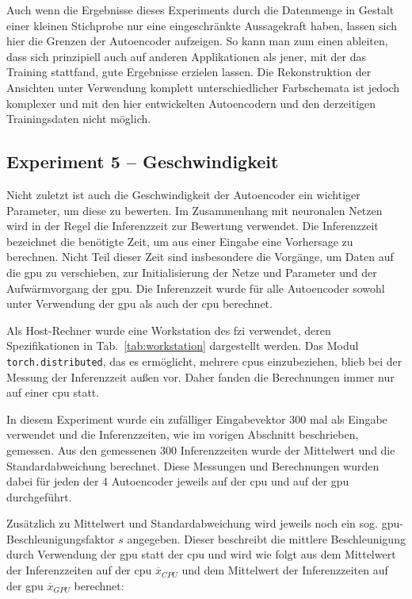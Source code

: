 Auch wenn die Ergebnisse dieses Experiments durch die Datenmenge in Gestalt einer kleinen Stichprobe nur eine eingeschränkte Aussagekraft haben, lassen sich hier die Grenzen der Autoencoder aufzeigen. So kann man zum einen ableiten, dass sich prinzipiell auch auf anderen Applikationen als jener, mit der das Training stattfand, gute Ergebnisse erzielen lassen. Die Rekonstruktion der Ansichten unter Verwendung komplett unterschiedlicher Farbschemata ist jedoch komplexer und mit den hier entwickelten Autoencodern und den derzeitigen Trainingsdaten nicht möglich.

\subsection{Experiment 5 -- Geschwindigkeit}
\label{subsec:exp5}
Nicht zuletzt ist auch die Geschwindigkeit der Autoencoder ein wichtiger Parameter, um diese zu bewerten. Im Zusammenhang mit neuronalen Netzen wird in der Regel die Inferenzzeit zur Bewertung verwendet. Die Inferenzzeit bezeichnet die benötigte Zeit, um aus einer Eingabe eine Vorhersage zu berechnen. Nicht Teil dieser Zeit sind insbesondere die Vorgänge, um Daten auf die \gls{gpu} zu verschieben, zur Initialisierung der Netze und Parameter und der Aufwärmvorgang der \gls{gpu}. Die Inferenzzeit wurde für alle Autoencoder sowohl unter Verwendung der \gls{gpu} als auch der \gls{cpu} berechnet.

Als Host-Rechner wurde eine Workstation des \gls{fzi} verwendet, deren Spezifikationen in Tab.~\ref{tab:workstation} dargestellt werden. Das Modul \texttt{torch.distributed}, das es ermöglicht, mehrere \glspl{cpu} einzubeziehen, blieb bei der Messung der Inferenzzeit außen vor. Daher fanden die Berechnungen immer nur auf einer \gls{cpu} statt.

In diesem Experiment wurde ein zufälliger Eingabevektor 300 mal als Eingabe verwendet und die Inferenzzeiten, wie im vorigen Abschnitt beschrieben, gemessen. Aus den gemessenen 300 Inferenzzeiten wurde der Mittelwert und die Standardabweichung berechnet. Diese Messungen und Berechnungen wurden dabei für jeden der 4 Autoencoder jeweils auf der \gls{cpu} und auf der \gls{gpu} durchgeführt.

\pagebreak
Zusätzlich zu Mittelwert und Standardabweichung wird jeweils noch ein sog. \gls{gpu}-Beschleunigungsfaktor $s$ angegeben.
Dieser beschreibt die mittlere Beschleunigung durch Verwendung der \gls{gpu} statt der \gls{cpu} und wird wie folgt aus dem Mittelwert der Inferenzzeiten auf der \gls{cpu} $\overline{x}_{CPU}$ und dem Mittelwert der Inferenzzeiten auf der \gls{gpu} $\overline{x}_{GPU}$ berechnet:

